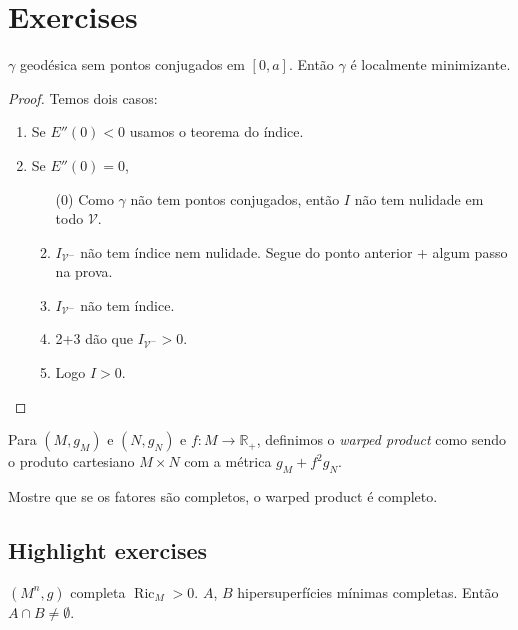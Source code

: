 \section{Exercises}
\label{section-exercises}

\begin{exercise}
\label{exercise-pts}
$\gamma$ geodésica sem pontos conjugados em $[0,a]$. Então $\gamma$ é localmente
minimizante.
\end{exercise}

\begin{proof}
Temos dois casos:
\begin{enumerate}
\item Se $E''(0)<0$ usamos o teorema do índice.
\item Se $E''(0)=0$,
\begin{enumerate}
\item[(0)] Como $\gamma$ não tem pontos conjugados, então $I$ não tem
		nulidade em todo  $\mathcal{V}$.
\item $I_{\mathcal{V}^-}$ não tem índice nem nulidade. Segue do ponto anterior +
	algum passo na prova.
\item $I_{\mathcal{V}^-}$ não tem índice.
\item 2+3 dão que $I_{\mathcal{V}^-}>0$.
\item Logo $I>0$.
\end{enumerate}
\end{enumerate}
\end{proof}

\begin{exercise}
\label{exercise-wraped-product}
Para $(M,g_M)$ e $(N,g_N)$ e $f:M \to \mathbb{R}_+$, definimos o {\it warped
product} como sendo o produto cartesiano $M\times N$ com a métrica 
 $g_M+f^2g_N$.

Mostre que se os fatores são completos, o warped product é completo.
\end{exercise}

\subsection{Highlight exercises}
\label{subsection-highlight-exercises}
\begin{exercise}
\label{exercise-minimal-intersection}
$(M^n,g)$ completa $\operatorname{Ric}_M>0$. $A$, $B$ hipersuperfícies mínimas
completas. Então  $A \cap B \neq \emptyset$.
\end{exercise}

